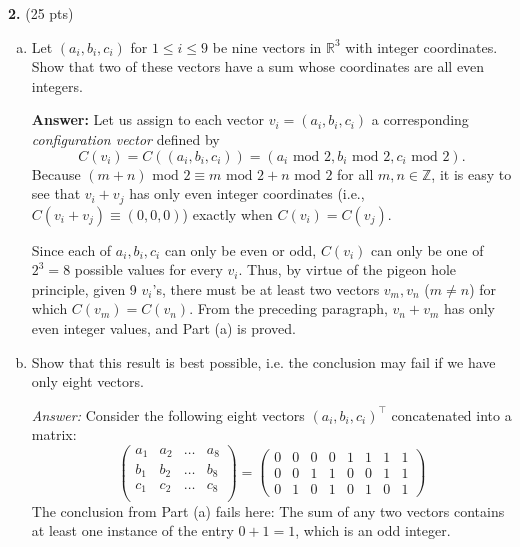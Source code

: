 \documentclass[11pt]{article}
\begin{document}
\noindent \textbf{2.} (25 pts)
\begin{enumerate}[(a)]
	\item Let $(a_i, b_i, c_i)$ for $1 \leq i \leq 9$ be nine vectors in $\mathbb{R}^3$ with integer coordinates. Show that two of these vectors have a sum whose coordinates are all even integers.
	
	\textbf{Answer:} Let us assign to each vector $v_i = (a_i,b_i,c_i)$ a corresponding \textit{configuration vector} defined by 
	\begin{equation*}
	C(v_i) = C((a_i,b_i,c_i)) = (a_i \text{ mod } 2, b_i \text{ mod } 2, c_i \text{ mod } 2).
	\end{equation*} 
	Because $(m+n) \text{ mod } 2 \equiv m \text{ mod }2 + n \text{ mod }2$ for all $m,n\in \mathbb{Z}$, it is easy to see that $v_i + v_j$ has only even integer coordinates (i.e., $C(v_i+v_j) \equiv (0,0,0)$) exactly when $C(v_i) = C(v_j)$.
	
	Since each of $a_i,b_i,c_i$ can only be even or odd, $C(v_i)$ can only be one of $2^3 = 8$ possible values for every $v_i$. Thus, by virtue of the pigeon hole principle, given 9 $v_i$'s, there must be at least two vectors $v_m,v_n$ ($m\neq n$) for which $C(v_m) = C(v_n)$. From the preceding paragraph, $v_n + v_m$ has only even integer values, and Part (a) is proved. 
	
	
	\item Show that this result is best possible, i.e. the conclusion may fail if we have only eight vectors. 
	
	\textit{Answer:} Consider the following eight vectors $(a_i,b_i,c_i)^\top$ concatenated into a matrix:
	\begin{equation*}
	\begin{pmatrix}
	a_1 & a_2 & \dots & a_8\\
	b_1 & b_2 & \dots & b_8\\
	c_1 & c_2 & \dots & c_8\\
	\end{pmatrix}
	=
	\begin{pmatrix}
	0&0&0&0&1&1&1&1\\
	0&0&1&1&0&0&1&1\\
	0&1&0&1&0&1&0&1
	\end{pmatrix}
	\end{equation*}
	The conclusion from Part (a) fails here: The sum of any two vectors contains at least one instance of the entry $0+1=1$, which is an odd integer.
\end{enumerate}
\end{document}
